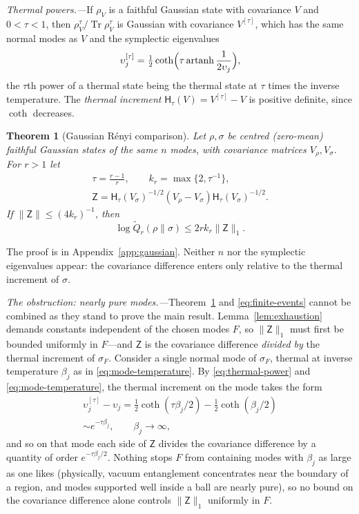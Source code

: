 \documentclass[aps,prl,reprint,longbibliography,raggedbottom]{revtex4-2}
\newtheorem{theorem}{Theorem}
\newcommand{\norm}[1]{\lVert #1\rVert}
\DeclareMathOperator{\Tr}{Tr}
\DeclareMathOperator{\artanh}{artanh}
\newcommand{\Therm}{\mathsf H}
\newcommand{\Qtil}{\widetilde Q}
\begin{document}
\emph{Thermal powers.---}If $\rho_V$ is a faithful Gaussian state with
covariance $V$ and $0<\tau<1$, then $\rho_V^\tau/\Tr\rho_V^\tau$ is
Gaussian with covariance $V^{[\tau]}$, which has the same normal modes
as $V$ and the symplectic eigenvalues \cite[Proposition~1]{SLW18}
\begin{equation}
\upsilon_j^{[\tau]}=\tfrac12\coth\Bigl(\tau\artanh\frac1{2\upsilon_j}\Bigr),
\label{eq:thermal-power}
\end{equation}
the $\tau$th power of a thermal state being the thermal state at
$\tau$ times the inverse temperature. The \emph{thermal increment}
$\Therm_\tau(V)=V^{[\tau]}-V$ is positive definite, since $\coth$
decreases.

\begin{theorem}[Gaussian R\'enyi comparison]\label{thm:gaussian}
Let $\rho,\sigma$ be centred (zero-mean) faithful Gaussian states of the same $n$
modes, with covariance matrices $V_\rho,V_\sigma$. For $r>1$ let
\[
\begin{gathered}
\tau=\frac{r-1}r,\qquad k_r=\max\{2,\tau^{-1}\},\\
\mathsf Z=\Therm_\tau(V_\sigma)^{-1/2}(V_\rho-V_\sigma)\Therm_\tau(V_\sigma)^{-1/2}.
\end{gathered}
\]
If $\norm{\mathsf Z}\le(4k_r)^{-1}$, then
\begin{equation}
\log\Qtil_r(\rho\|\sigma)\le2rk_r\norm{\mathsf Z}_1 .
\label{eq:gaussian-bound}
\end{equation}
\end{theorem}

The proof is in Appendix~\ref{app:gaussian}. Neither $n$ nor the
symplectic eigenvalues appear: the covariance difference enters only
relative to the thermal increment of $\sigma$.

\emph{The obstruction: nearly pure modes.---}Theorem~\ref{thm:gaussian}
and \eqref{eq:finite-events} cannot be combined as they stand to prove the main result.
Lemma~\ref{lem:exhaustion} demands constants independent of the chosen
modes $F$, so $\norm{\mathsf Z}_1$ must first be bounded uniformly in
$F$---and $\mathsf Z$ is the covariance difference \emph{divided by}
the thermal increment of $\sigma_F$. Consider a single normal mode of
$\sigma_F$, thermal at inverse temperature $\beta_j$ as in
\eqref{eq:mode-temperature}. By \eqref{eq:thermal-power} and \eqref{eq:mode-temperature}, the thermal increment
on the mode takes the form
\[
\begin{gathered}
\upsilon_j^{[\tau]}-\upsilon_j
=\tfrac12\coth(\tau\beta_j/2)-\tfrac12\coth(\beta_j/2)\\
\sim e^{-\tau\beta_j},\qquad\beta_j\to\infty,
\end{gathered}
\]
and so on that mode each side of $\mathsf Z$ divides the covariance
difference by a quantity of order $e^{-\tau\beta_j/2}$. Nothing stops $F$ from
containing modes with $\beta_j$ as large as one likes (physically,
vacuum entanglement concentrates near the boundary of a region, and
modes supported well inside a ball are nearly pure), so no bound on
the covariance difference alone controls $\norm{\mathsf Z}_1$
uniformly in $F$.
\end{document}
